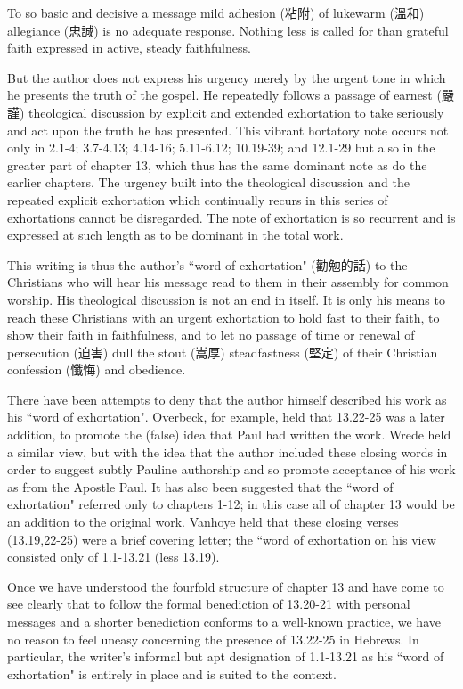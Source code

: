 To so basic and decisive a message mild adhesion (粘附) of lukewarm (溫和)
allegiance (忠誠) is no adequate response.
Nothing less is called for than grateful faith expressed in active, steady
faithfulness.

But the author does not express his urgency merely by the urgent tone in which
he presents the truth of the gospel.
He repeatedly follows a passage of earnest (嚴謹) theological discussion by
explicit and extended exhortation to take seriously and act upon the truth he
has presented.
This vibrant hortatory note occurs not only in 2.1-4; 3.7-4.13; 4.14-16;
5.11-6.12; 10.19-39; and 12.1-29 but also in the greater part of chapter 13,
which thus has the same dominant note as do the earlier chapters.
The urgency built into the theological discussion and the repeated explicit
exhortation which continually recurs in this series of exhortations cannot be
disregarded.
The note of exhortation is so recurrent and is expressed at such length as to
be dominant in the total work.

This writing is thus the author's ``word of exhortation" (勸勉的話) to the
Christians who will hear his message read to them in their assembly for common
worship.
His theological discussion is not an end in itself.
It is only his means to reach these Christians with an urgent exhortation to
hold fast to their faith, to show their faith in faithfulness, and to let no
passage of time or renewal of persecution (迫害) dull the stout (嵩厚)
steadfastness (堅定) of their Christian confession (懺悔) and obedience.

There have been attempts to deny that the author himself described his work as
his ``word of exhortation".
Overbeck, for example, held that 13.22-25 was a later addition, to promote the
(false) idea that Paul had written the work.
Wrede held a similar view, but with the idea that the author included these
closing words in order to suggest subtly Pauline authorship and so promote
acceptance of his work as from the Apostle Paul.
It has also been suggested that the ``word of exhortation" referred only to
chapters 1-12; in this case all of chapter 13 would be an addition to the
original work.
Vanhoye held that these closing verses (13.19,22-25) were a brief covering
letter; the ``word of exhortation on his view consisted only of 1.1-13.21
(less 13.19).

Once we have understood the fourfold structure of chapter 13 and have come to
see clearly that to follow the formal benediction of 13.20-21 with personal
messages and a shorter benediction conforms to a well-known practice, we have
no reason to feel uneasy concerning the presence of 13.22-25 in Hebrews.
In particular, the writer's informal but apt designation of 1.1-13.21 as his
``word of exhortation" is entirely in place and is suited to the context.

